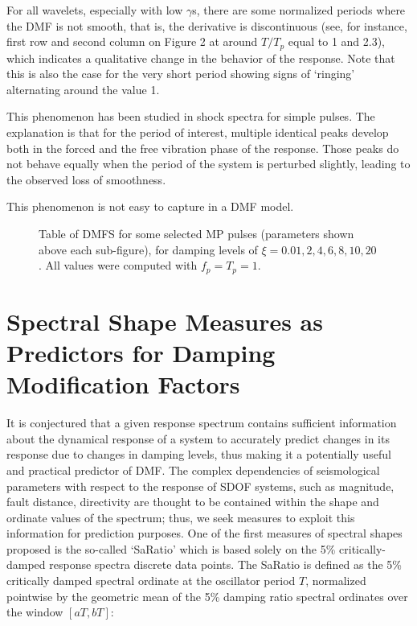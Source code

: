 For all wavelets, especially with low \(\gamma\)s, there are some
normalized periods where the DMF is not smooth, that is, the derivative
is discontinuous (see, for instance, first row and second column on
Figure 2 at around \(T/T_p\) equal to 1 and 2.3), which indicates a
qualitative change in the behavior of the response. Note that this is
also the case for the very short period showing signs of `ringing'
alternating around the value 1.

This phenomenon has been studied in shock spectra for simple
pulses. The explanation is that for
the period of interest, multiple identical peaks develop both in the
forced and the free vibration phase of the response. Those peaks do not
behave equally when the period of the system is perturbed slightly,
leading to the observed loss of smoothness.

This phenomenon is not easy to capture in a DMF model.

\begin{figure}
\centering
{}
\caption{Table of DMFS for some selected MP pulses (parameters shown
above each sub-figure), for damping levels of
\(\xi = 0.01, 2, 4, 6, 8, 10, 20%
\). All values were computed with \(f_p = T_p = 1\).}
\end{figure}

\section{Spectral Shape Measures as Predictors for Damping Modification
Factors}\label{spectral-shape-measures-as-predictors-for-damping-modification-factors}

It is conjectured that a given response spectrum contains sufficient
information about the dynamical response of a system to accurately
predict changes in its response due to changes in damping levels, thus
making it a potentially useful and practical predictor of DMF. The
complex dependencies of seismological parameters with respect to the
response of SDOF systems, such as magnitude, fault distance, directivity
are thought to be contained within the shape and ordinate values of the
spectrum; thus, we seek measures to exploit this information for
prediction purposes. One of the first measures of spectral shapes
proposed is the so-called `SaRatio' 
which is based solely on the 5\% critically-damped response spectra
discrete data points. The SaRatio is defined as the 5\% critically
damped spectral ordinate at the oscillator period \(T\), normalized
pointwise by the geometric mean of the 5\% damping ratio spectral
ordinates over the window \([aT, bT]\):

